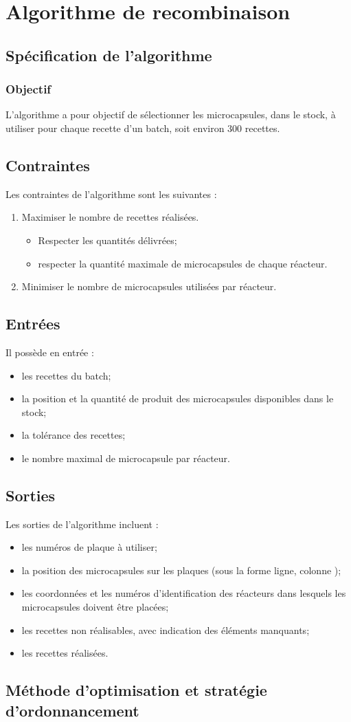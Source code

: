 \section{Algorithme de recombinaison}
\subsection{Spécification de l'algorithme}
\subsubsection*{Objectif}
L'algorithme a pour objectif de sélectionner les microcapsules, dans le stock, à utiliser pour chaque recette d'un batch, soit environ $300$ recettes.

\subsection*{Contraintes}
Les contraintes de l'algorithme sont les suivantes : 
\begin{enumerate}
    \item Maximiser le nombre de recettes réalisées.
    \begin{itemize}
        \item Respecter les quantités délivrées;
        \item respecter la quantité maximale de microcapsules de chaque réacteur.
    \end{itemize}    
    \item Minimiser le nombre de microcapsules utilisées par réacteur.
\end{enumerate}
\subsection*{Entrées}
Il possède en entrée : 
\begin{itemize}
    \item les recettes du batch;
    \item la position et la quantité de produit des microcapsules disponibles dans le stock;
    \item la tolérance des recettes;
    \item le nombre maximal de microcapsule par réacteur.
\end{itemize}

\subsection*{Sorties}
Les sorties de l'algorithme incluent : 
\begin{itemize}
    \item les numéros de plaque à utiliser;
    \item la position des microcapsules sur les plaques (sous la forme \og{}ligne, colonne\fg{} );
    \item les coordonnées et les numéros d'identification des réacteurs dans lesquels les microcapsules doivent être placées;
    \item les recettes non réalisables, avec indication des éléments manquants;
    \item les recettes réalisées.
\end{itemize}
\subsection{Méthode d'optimisation et stratégie d'ordonnancement}